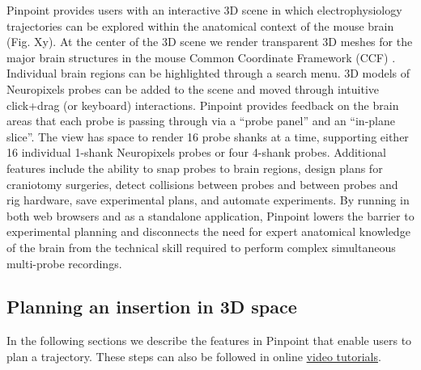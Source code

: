 
Pinpoint provides users with an interactive 3D scene in which electrophysiology trajectories can be explored within the anatomical context of the mouse brain (Fig. Xy). At the center of the 3D scene we render transparent 3D meshes for the major brain structures in the mouse Common Coordinate Framework (CCF) \citep{wang2020allen}. Individual brain regions can be highlighted through a search menu. 3D models of Neuropixels probes \citep{jun2017fully} can be added to the scene and moved through intuitive click+drag (or keyboard) interactions. Pinpoint provides feedback on the brain areas that each probe is passing through via a ``probe panel'' and an ``in-plane slice''. The view has space to render 16 probe shanks at a time, supporting either 16 individual 1-shank Neuropixels probes or four 4-shank probes. Additional features include the ability to snap probes to brain regions, design plans for craniotomy surgeries, detect collisions between probes and between probes and rig hardware, save experimental plans, and automate experiments. By running in both web browsers and as a standalone application, Pinpoint lowers the barrier to experimental planning and disconnects the need for expert anatomical knowledge of the brain from the technical skill required to perform complex simultaneous multi-probe recordings. 


\subsection{Planning an insertion in 3D space}

In the following sections we describe the features in Pinpoint that enable users to plan a trajectory. These steps can also be followed in online \href{https://virtualbrainlab.org/02_traj_planner/02_tp_tutorial.html}{video tutorials}. 

